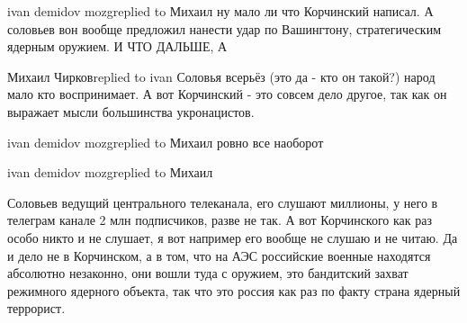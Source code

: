  
 
 
 
 


ivan demidov mozgreplied to Михаил
ну мало ли что Корчинский написал. А соловьев вон вообще предложил нанести удар по Вашингтону, стратегическим ядерным оружием. И ЧТО ДАЛЬШЕ, А

Михаил Чирковreplied to ivan
Соловья всерьёз (это да - кто он такой?) народ мало кто воспринимает. 
А вот Корчинский - это совсем дело другое, так как он выражает мысли большинства укронацистов.

ivan demidov mozgreplied to Михаил
ровно все наоборот

ivan demidov mozgreplied to Михаил

Соловьев ведущий центрального телеканала, его слушают миллионы, у него в
телеграм канале 2 млн подписчиков, разве не так. А вот Корчинского как раз
особо никто и не слушает, я вот например его вообще не слушаю и не читаю. Да и
дело не в Корчинском, а в том, что на АЭС российские военные находятся
абсолютно незаконно, они вошли туда с оружием, это бандитский захват режимного
ядерного объекта, так что это россия как раз по факту страна ядерный террорист.
